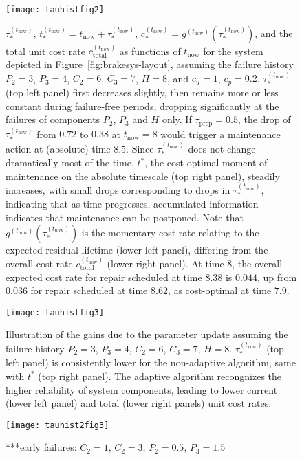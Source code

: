 \documentclass[authoryear]{elsarticle}
\def\tnow{t_\text{now}}
\newcommand{\gnow}{g^{(\tnow)}}
\newcommand{\tausnow}{\tau_*^{(\tnow)}}
\newcommand{\tprep}{\tau_{\text{prep}}}
\newcommand{\tstarnow}{t_*^{(\tnow)}}
\newcommand{\cstarnow}{c_*^{(\tnow)}}
\newcommand{\ctotalnow}{c_\text{total}^{(\tnow)}}
\begin{document}
\begin{figure}
\texttt{[image: tauhistfig2]}
\caption{$\tausnow$, $\tstarnow = \tnow + \tausnow$, $\cstarnow = \gnow(\tausnow)$,
and the total unit cost rate $\ctotalnow$ as functions of $\tnow$
for the system depicted in Figure~\ref{fig:brakesys-layout},
assuming the failure history $P_2 = 3$, $P_3 = 4$, $C_2 = 6$, $C_3 = 7$, $H = 8$,
and $c_u = 1$, $c_p = 0.2$.
$\tausnow$ (top left panel) first decreases slightly, then remains more or less constant during failure-free periods,
dropping significantly at the failures of components $P_2$, $P_3$ and $H$ only.
If $\tprep = 0.5$, the drop of $\tausnow$ from $0.72$ to $0.38$ at $\tnow = 8$ would trigger a maintenance action
at (absolute) time $8.5$.
Since $\tausnow$ does not change dramatically most of the time, $t^*$,
the cost-optimal moment of maintenance on the absolute timescale (top right panel),
steadily increases, with small drops corresponding to drops in $\tausnow$,
indicating that as time progresses, accumulated information indicates that maintenance can be postponed.
Note that $\gnow(\tausnow)$ is the momentary cost rate relating to the expected residual lifetime (lower left panel),
differing from the overall cost rate $\ctotalnow$ (lower right panel).
At time $8$, the overall expected cost rate for repair scheduled at time $8.38$ is $0.044$,
up from $0.036$ for repair scheduled at time $8.62$, as cost-optimal at time $7.9$.}
\label{fig:tauhistfig2}
\end{figure}

\begin{figure}
\texttt{[image: tauhistfig3]}
\caption{Illustration of the gains due to the parameter update
assuming the failure history $P_2 = 3$, $P_3 = 4$, $C_2 = 6$, $C_3 = 7$, $H = 8$.
$\tausnow$ (top left panel) is consistently lower for the non-adaptive algorithm,
same with $t^*$ (top right panel).
The adaptive algorithm recongnizes the higher reliability of system components,
leading to lower current (lower left panel) and total (lower right panels) unit cost rates.}
\label{fig:tauhistfig3}
\end{figure}


\begin{figure}
\texttt{[image: tauhist2fig3]}
\caption{***early failures: $C_2 = 1$, $C_2 = 3$, $P_2 = 0.5$, $P_3 = 1.5$}
\label{fig:tauhist2fig3}
\end{figure}
\end{document}
